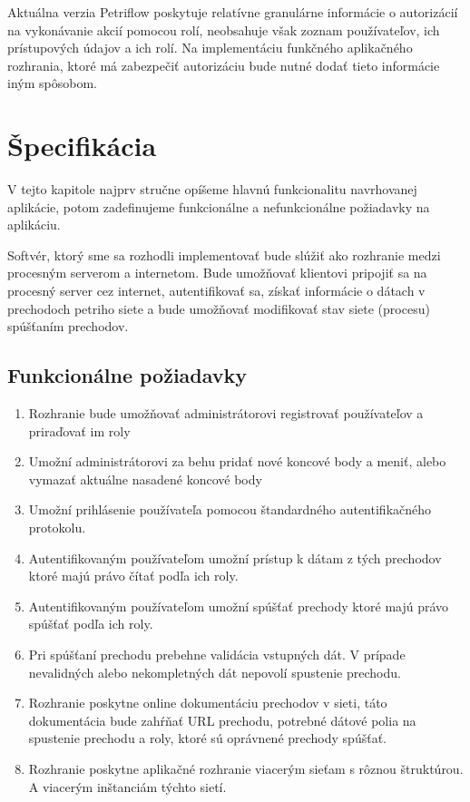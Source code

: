 Aktuálna verzia Petriflow poskytuje relatívne granulárne informácie o autorizácií na vykonávanie akcií pomocou rolí, neobsahuje však zoznam používateľov, ich prístupových údajov a ich rolí. Na implementáciu funkčného aplikačného rozhrania, ktoré má zabezpečiť autorizáciu bude nutné dodať tieto informácie iným spôsobom.


\section{Špecifikácia}

V tejto kapitole najprv stručne opíšeme hlavnú funkcionalitu navrhovanej aplikácie, potom zadefinujeme funkcionálne a nefunkcionálne požiadavky na aplikáciu.

Softvér, ktorý sme sa rozhodli implementovať bude slúžiť ako rozhranie medzi procesným serverom a internetom. Bude umožňovať klientovi pripojiť sa na procesný server cez internet, autentifikovať sa, získať informácie o dátach v prechodoch petriho siete a bude umožňovať modifikovať stav siete (procesu) spúšťaním prechodov.

\subsection{Funkcionálne požiadavky}

\begin{enumerate}
\item Rozhranie bude umožňovať administrátorovi registrovať používateľov a priraďovať im roly
\item Umožní administrátorovi za behu pridať nové koncové body a meniť, alebo vymazať aktuálne nasadené koncové body
\item Umožní prihlásenie používateľa pomocou štandardného autentifikačného protokolu.
\item Autentifikovaným používateľom umožní prístup k dátam z tých prechodov ktoré majú právo čítať podľa ich roly.
\item Autentifikovaným používateľom umožní spúšťať prechody ktoré majú právo spúšťať podľa ich roly.
\item Pri spúšťaní prechodu prebehne validácia vstupných dát. V prípade nevalidných alebo nekompletných dát nepovolí spustenie prechodu.
\item Rozhranie poskytne online dokumentáciu prechodov v sieti, táto dokumentácia bude zahŕňať URL prechodu, potrebné dátové polia na spustenie prechodu a roly, ktoré sú oprávnené prechody spúšťať.
\item Rozhranie poskytne aplikačné rozhranie viacerým sieťam s rôznou štruktúrou. A viacerým inštanciám týchto sietí.
\end{enumerate}

